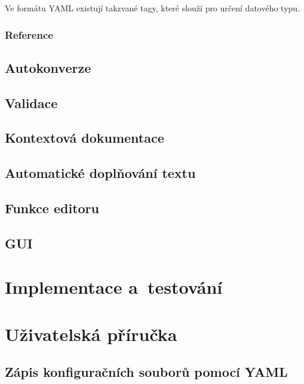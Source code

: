 \documentclass[FM,bw,DP]{tulthesis}
\begin{document}
Ve formátu YAML existují takzvané tagy, které slouží pro určení datového typu. 


\subsection{Reference}

\section{Autokonverze}

\section{Validace}

\section{Kontextová dokumentace}

\section{Automatické doplňování textu}

\section{Funkce editoru}

\section{GUI}


\chapter{Implementace a~testování}






\chapter{Uživatelská příručka}

\section{Zápis konfiguračních souborů pomocí YAML}
\end{document}

